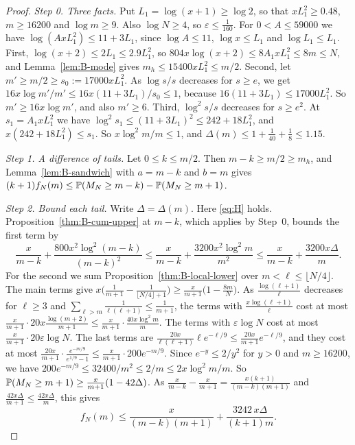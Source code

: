 \begin{proof}
\emph{Step 0. Three facts.} Put $L_1=\log(x+1)\ge\log2$, so that $xL_1^2\ge0.48$,
$m\ge16200$ and $\log m\ge9$. Also $\log N\ge4$, so $\varepsilon\le\frac1{160}$. For
$0<A\le59000$ we have $\log(AxL_1^2)\le11+3L_1$, since $\log A\le11$, $\log x\le L_1$ and
$\log L_1\le L_1$. First, $\log(x+2)\le2L_1\le2.9L_1^2$, so
$804x\log(x+2)\le8A_1xL_1^2\le8m\le N$, and Lemma~\ref{lem:B-mode} gives
$m_h\le15400xL_1^2\le m/2$. Second, let $m'\ge m/2\ge s_0:=17000xL_1^2$. As $\log s/s$
decreases for $s\ge e$, we get
$16x\log m'/m'\le16x(11+3L_1)/s_0\le1$, because $16(11+3L_1)\le17000L_1^2$. So
$m'\ge16x\log m'$, and also $m'\ge6$. Third, $\log^2s/s$ decreases for $s\ge e^2$. At
$s_1=A_1xL_1^2$ we have $\log^2s_1\le(11+3L_1)^2\le242+18L_1^2$, and
$x(242+18L_1^2)\le s_1$. So $x\log^2m/m\le1$, and $\Delta(m)\le1+\frac1{40}+\frac18\le1.15$.

\emph{Step 1. A difference of tails.} Let $0\le k\le m/2$. Then
$m-k\ge m/2\ge m_h$, and
Lemma~\ref{lem:B-sandwich} with $a=m-k$ and $b=m$ gives
$(k+1)f_N(m)\le\mathbb{P}(M_N\ge m-k)-\mathbb{P}(M_N\ge m+1)$.

\emph{Step 2. Bound each tail.} Write $\Delta=\Delta(m)$. Here \eqref{eq:H} holds.
Proposition~\ref{thm:B-cum-upper} at $m-k$, which applies by Step~0, bounds the first term by
\[
 \frac x{m-k}+\frac{800x^2\log^2(m-k)}{(m-k)^2}\le\frac x{m-k}+\frac{3200x^2\log^2m}{m^2}
 \le\frac x{m-k}+\frac{3200x\Delta}m .
\]
For the second we sum Proposition~\ref{thm:B-local-lower} over $m<\ell\le\lfloor N/4\rfloor$.
The main terms give
$x\bigl(\frac1{m+1}-\frac1{\lfloor N/4\rfloor+1}\bigr)\ge\frac x{m+1}\bigl(1-\frac{8m}N\bigr)$.
As $\frac{\log(\ell+1)}\ell$ decreases for $\ell\ge3$ and $\sum_{\ell>m}\frac1{\ell(\ell+1)}\le\frac1{m+1}$,
the terms with $\frac{x\log(\ell+1)}\ell$ cost at most
$\frac x{m+1}\cdot20x\frac{\log(m+2)}{m+1}\le\frac x{m+1}\cdot\frac{40x\log^2m}m$. The terms
with $\varepsilon\log N$ cost at most $\frac x{m+1}\cdot20\varepsilon\log N$. The last terms are
$\frac{20x}{\ell(\ell+1)}\ell e^{-\ell/9}\le\frac{20x}{m+1}e^{-\ell/9}$, and they cost at most
$\frac{20x}{m+1}\cdot\frac{e^{-m/9}}{e^{1/9}-1}\le\frac x{m+1}\cdot200e^{-m/9}$. Since
$e^{-y}\le2/y^2$ for $y>0$ and $m\ge16200$, we have
$200e^{-m/9}\le32400/m^2\le2/m\le2x\log^2m/m$. So
$\mathbb{P}(M_N\ge m+1)\ge\frac x{m+1}(1-42\Delta)$. As $\frac x{m-k}-\frac
x{m+1}=\frac{x(k+1)}{(m-k)(m+1)}$ and $\frac{42x\Delta}{m+1}\le\frac{42x\Delta}m$, this gives
\[
 f_N(m)\le\frac{x}{(m-k)(m+1)}+\frac{3242\,x\Delta}{(k+1)m} .
\]


\end{proof}
